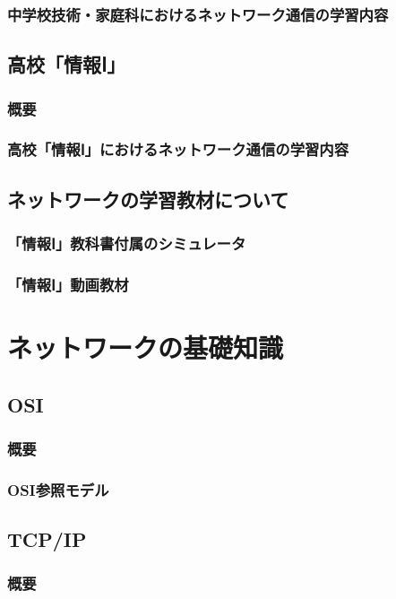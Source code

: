 \documentclass[12pt,a4j,titlepage]{ltjsarticle}
\begin{document}
\subsubsection{中学校技術・家庭科におけるネットワーク通信の学習内容}

\subsection{高校「情報Ⅰ」}
\subsubsection{概要}
\subsubsection{高校「情報Ⅰ」におけるネットワーク通信の学習内容}

\subsection{ネットワークの学習教材について}
\subsubsection{「情報Ⅰ」教科書付属のシミュレータ}
\subsubsection{「情報Ⅰ」動画教材}

\clearpage

\section{ネットワークの基礎知識}%

\subsection{OSI}
\subsubsection{概要}
\subsubsection{OSI参照モデル}
\subsection{TCP/IP}
\subsubsection{概要}
\end{document}
